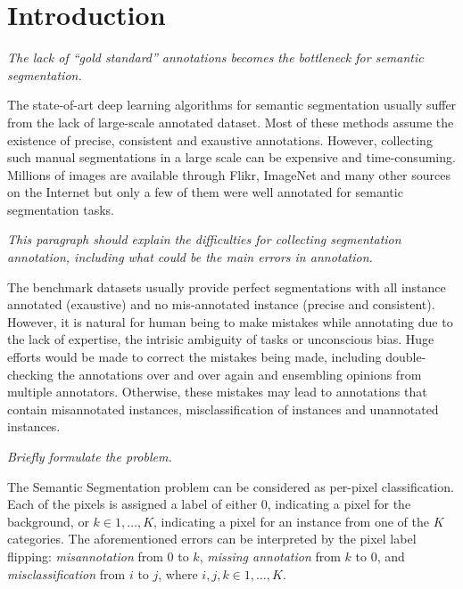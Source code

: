 \section{Introduction}
\label{introduction}

\noindent
\textit{The lack of ``gold standard'' annotations becomes the bottleneck for semantic segmentation.}

\noindent
The state-of-art deep learning algorithms for semantic segmentation \cite{long2015fully} usually suffer from the lack of large-scale annotated dataset.
Most of these methods assume the existence of precise, consistent and exaustive annotations. However, collecting such manual segmentations in a large scale can be expensive and time-consuming.
Millions of images are available through Flikr, ImageNet and many other sources on the Internet but only a few of them were well annotated for semantic segmentation tasks. \cite{everingham2015pascal,mottaghi2014role,lin2014microsoft}


\noindent
\textit{This paragraph should explain the difficulties for collecting segmentation annotation, including what could be the main errors in annotation.}

\noindent
The benchmark datasets usually provide perfect segmentations with all instance annotated (exaustive) and no mis-annotated instance (precise and consistent).
However, it is natural for human being to make mistakes while annotating due to the lack of expertise, the intrisic ambiguity of tasks or unconscious bias.
Huge efforts would be made to correct the mistakes being made, including double-checking the annotations over and over again and ensembling opinions from multiple annotators.
Otherwise, these mistakes may lead to annotations that contain misannotated instances, misclassification of instances and unannotated instances.


\noindent
\textit{Briefly formulate the problem.}

\noindent
\noindent
The Semantic Segmentation problem can be considered as per-pixel classification. Each of the pixels is assigned a label of either $0$, indicating a pixel for the background, or $k \in {1, \ldots, K}$, indicating a pixel for an instance from one of the $K$ categories.
The aforementioned errors can be interpreted by the pixel label flipping:
\textit{misannotation} from $0$ to $k$, \textit{missing annotation} from $k$ to $0$, and \textit{misclassification} from $i$ to $j$, where $i, j, k \in {1, \ldots, K}$.

